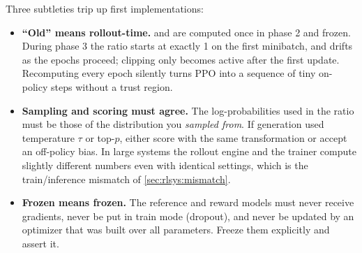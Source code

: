 Three subtleties trip up first implementations:

\begin{itemize}
  \item \textbf{``Old'' means rollout-time.}  and  are computed once in
        phase 2 and frozen. During phase 3 the ratio starts at exactly 1 on the first minibatch,
        and drifts as the epochs proceed; clipping only becomes active after the first update.
        Recomputing  every epoch silently turns PPO into a sequence of tiny
        on-policy steps without a trust region.
  \item \textbf{Sampling and scoring must agree.} The log-probabilities used in the ratio must be those
        of the distribution you \emph{sampled from}. If generation used temperature $\tau$ or top-$p$,
        either score with the same transformation or accept an off-policy bias. In large systems the
        rollout engine and the trainer compute slightly different numbers even with identical settings,
        which is the train/inference mismatch of \cref{sec:rlsys:mismatch}.
  \item \textbf{Frozen means frozen.} The reference and reward models must never receive gradients, never
        be put in train mode (dropout), and never be updated by an optimizer that was built over all
        parameters. Freeze them explicitly and assert it.
\end{itemize}


